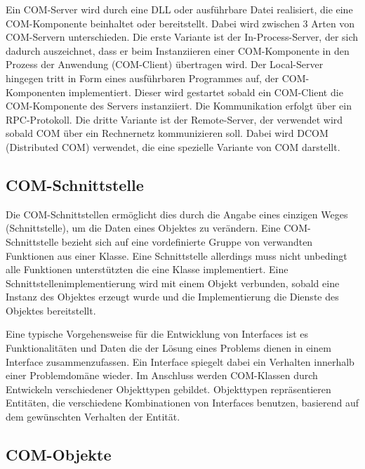 Ein COM-Server wird durch eine DLL oder ausführbare Datei realisiert, die eine COM-Komponente beinhaltet oder bereitstellt. Dabei wird zwischen 3 Arten von COM-Servern unterschieden. Die erste Variante ist der In-Process-Server, der sich dadurch auszeichnet, dass er beim Instanziieren einer COM-Komponente in den Prozess der Anwendung (COM-Client) übertragen wird. Der Local-Server hingegen tritt in Form eines ausführbaren Programmes auf, der COM-Komponenten implementiert. Dieser wird gestartet sobald ein COM-Client die COM-Komponente des Servers instanziiert. Die Kommunikation erfolgt über ein RPC-Protokoll. Die dritte Variante ist der Remote-Server, der verwendet wird sobald COM über ein Rechnernetz kommunizieren  soll. Dabei wird DCOM (Distributed COM) verwendet, die eine spezielle Variante von COM darstellt.
 
\subsection{COM-Schnittstelle}
\label{ch:grundlagen:sec:ComponentObjectModel:subsec:COMSchnittstelle}

Die COM-Schnittstellen ermöglicht dies durch die Angabe eines einzigen Weges (Schnittstelle), um die Daten eines Objektes zu verändern. Eine COM-Schnittstelle bezieht sich auf eine vordefinierte Gruppe von verwandten Funktionen aus einer Klasse. Eine Schnittstelle allerdings muss nicht unbedingt alle Funktionen unterstützten die eine Klasse implementiert. Eine Schnittstellenimplementierung wird mit einem Objekt verbunden, sobald eine Instanz des Objektes erzeugt wurde und die Implementierung die Dienste des Objektes bereitstellt.

Eine typische Vorgehensweise für die Entwicklung von Interfaces ist es Funktionalitäten und Daten die der Lösung eines Problems dienen in einem Interface zusammenzufassen. Ein Interface spiegelt dabei ein Verhalten innerhalb einer Problemdomäne wieder. Im Anschluss werden COM-Klassen durch Entwickeln verschiedener Objekttypen gebildet. Objekttypen repräsentieren Entitäten, die verschiedene Kombinationen von Interfaces benutzen, basierend auf dem gewünschten Verhalten der Entität.

\subsection{COM-Objekte}
\label{ch:grundlagen:sec:ComponentObjectModel:subsec:COMObjekte}

